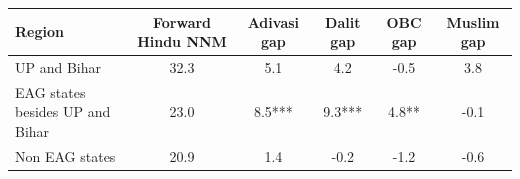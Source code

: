 \begin{tabular}{lccccc}
\hline
Region & Forward Hindu NNM & Adivasi gap & Dalit gap & OBC gap & Muslim gap \\
\hline
UP and Bihar&32.3&5.1&4.2&-0.5&3.8\\
EAG states besides UP and Bihar&23.0&8.5***&9.3***&4.8**&-0.1\\
Non EAG states&20.9&1.4&-0.2&-1.2&-0.6\\
\hline
\end{tabular}
